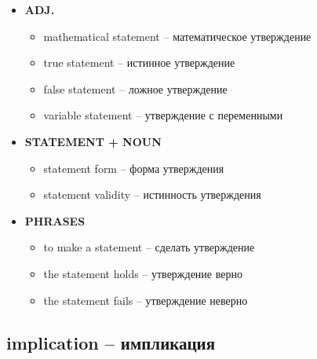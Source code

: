 \documentclass[a4paper, 10pt]{article}
\theoremstyle{definition}
\theoremstyle{plain}
\theoremstyle{remark}
\begin{document}
\begin{itemize}
    \item \textbf{ADJ.}
    \begin{itemize}
        \item mathematical statement – математическое утверждение
        \item true statement – истинное утверждение
        \item false statement – ложное утверждение
        \item variable statement – утверждение с переменными
    \end{itemize}
    
    \item \textbf{STATEMENT + NOUN}
    \begin{itemize}
        \item statement form – форма утверждения
        \item statement validity – истинность утверждения
    \end{itemize}
    
    \item \textbf{PHRASES}
    \begin{itemize}
        \item to make a statement – сделать утверждение
        \item the statement holds – утверждение верно
        \item the statement fails – утверждение неверно
    \end{itemize}
\end{itemize}

\subsection{implication – импликация}
\end{document}
